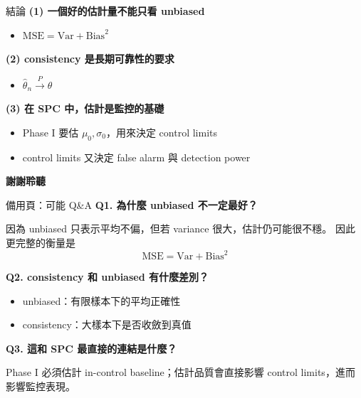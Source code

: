 \documentclass[aspectratio=169,12pt]{beamer}
\begin{document}
\begin{frame}{結論}
    \vspace{0.2cm}
    \textbf{(1) 一個好的估計量不能只看 unbiased}
    \begin{itemize}
        \item $\mathrm{MSE}=\mathrm{Var}+\mathrm{Bias}^2$
    \end{itemize}

    \vspace{0.8em}
    \textbf{(2) consistency 是長期可靠性的要求}
    \begin{itemize}
        \item $\hat{\theta}_n \xrightarrow{P} \theta$
    \end{itemize}

    \vspace{0.8em}
    \textbf{(3) 在 SPC 中，估計是監控的基礎}
    \begin{itemize}
        \item Phase I 要估 $\mu_0, \sigma_0$，用來決定 control limits
        \item control limits 又決定 false alarm 與 detection power
    \end{itemize}
    \vspace{0.8em}
\end{frame}

\begin{frame}
    \centering\Huge{\textbf{謝謝聆聽}}
\end{frame}
\begin{frame}{備用頁：可能 Q\&A}
\textbf{Q1. 為什麼 unbiased 不一定最好？}

因為 unbiased 只表示平均不偏，但若 variance 很大，估計仍可能很不穩。  
因此更完整的衡量是
$$
\mathrm{MSE}=\mathrm{Var}+\mathrm{Bias}^2
$$

\vspace{0.8em}
\textbf{Q2. consistency 和 unbiased 有什麼差別？}

\begin{itemize}
    \item unbiased：有限樣本下的平均正確性
    \item consistency：大樣本下是否收斂到真值
\end{itemize}

\vspace{0.8em}
\textbf{Q3. 這和 SPC 最直接的連結是什麼？}

Phase I 必須估計 in-control baseline；估計品質會直接影響 control limits，進而影響監控表現。
\end{frame}
\end{document}
